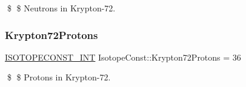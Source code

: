 \$ \$ Neutrons in Krypton-\/72. \mbox{\label{group___isotope_const-_krypton-_kr72_ga6b4407aa434d2a7ed847d5d26b5ded31}} 
\subsubsection{\texorpdfstring{Krypton72\+Protons}{Krypton72Protons}}
{\footnotesize\ttfamily \mbox{\hyperlink{group___isotope_const-_macros_ga5f18360b3e99483a35c32d789e62621c}{I\+S\+O\+T\+O\+P\+E\+C\+O\+N\+S\+T\+\_\+\+I\+NT}} Isotope\+Const\+::\+Krypton72\+Protons = 36}

\$ \$ Protons in Krypton-\/72. 